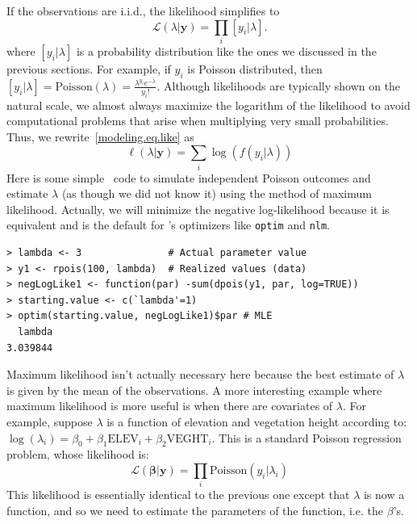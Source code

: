 If the observations are i.i.d., the likelihood simplifies to
\begin{equation}
  \mathcal{L}(\lambda | \mathbf{y}) = \prod_i [y_i | \lambda].
  \label{modeling.eq.like}
\end{equation}
where $[y_i | \lambda]$ is a probability distribution like the ones
we discussed in the previous sections. For example, if $y_i$ is
Poisson distributed, then
$[y_i | \lambda] = \text{Poisson}(\lambda) = \frac{\lambda^{y_i}e^{-\lambda}}{y_i!}$.
Although likelihoods are typically shown on the natural scale, we
almost always maximize the logarithm of the likelihood to
avoid computational problems that arise when multiplying very small
probabilities. Thus, we rewrite~\ref{modeling.eq.like} as
\begin{equation}
  \ell(\lambda | \mathbf{y}) = \sum_i \log(f(y_i | \lambda))
  \label{modeling.eq.like}
\end{equation}
Here is some simple \R~code to simulate independent Poisson outcomes
and estimate $\lambda$ (as though we did not know it) using the
method of maximum likelihood. Actually, we will minimize the negative
log-likelihood because it is equivalent and is the default for \R's
optimizers like \verb+optim+ and \verb+nlm+.
\begin{verbatim}
> lambda <- 3               # Actual parameter value
> y1 <- rpois(100, lambda)  # Realized values (data)
> negLogLike1 <- function(par) -sum(dpois(y1, par, log=TRUE))
> starting.value <- c(`lambda'=1)
> optim(starting.value, negLogLike1)$par # MLE
  lambda
3.039844
\end{verbatim}
Maximum likelihood isn't actually necessary here because the best estimate of
$\lambda$ is given by the mean of the observations. A more interesting
example where maximum likelihood is more useful is when there are
covariates of $\lambda$. For example, suppose $\lambda$ is a function
of elevation and vegetation height according to: $\log(\lambda_i) =
\beta_0 + \beta_1\text{ELEV}_i + \beta_2\text{VEGHT}_i$. This is a
standard Poisson regression problem, whose likelihood is:
\begin{equation}
  \mathcal{L}(\bm{\beta} | \mathbf{y}) = \prod_i \text{Poisson}(y_i | \lambda_i)
  \label{modeling.eq.like}
\end{equation}
This likelihood is essentially identical to the previous one except
that $\lambda$ is now a function, and so we need to estimate the
parameters of the function, i.e. the $\beta$'s. %
